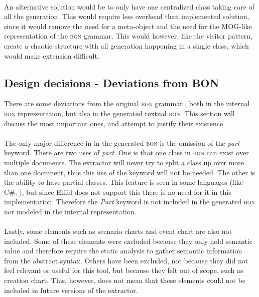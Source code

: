 \paragraph{}
An alternative solution would be to only have one centralized class taking care of all the generation. This would require less overhead than implemented solution, since it would remove the need for a meta-object and the need for the MOG-like representation of the \textsc{bon} grammar. This would however, like the visitor pattern, create a chaotic structure with all generation happening in a single class, which would make extension difficult.

\subsection{Design decisions - Deviations from BON}
\label{deviations_from_bon}There are some deviations from the original \textsc{bon} grammar \cite[pp.~352-359]{walden1995}, both in the internal \textsc{bon} representation, but also in the generated textual \textsc{bon}. This section will discuss the most important ones, and attempt to justify their existence. 

\paragraph{}
The only major difference in in the generated \textsc{bon} is the omission of the \textit{part} keyword. There are two uses of \textit{part}. One is that one class in \textsc{bon} can exist over multiple documents. The extractor will never try to split a class up over more than one document, thus this use of the keyword will not be needed. The other is the ability to have partial classes. This feature is seen in some languages (like C\#, \cite{msdn2009}), but since Eiffel does not support this there is no need for it in this implementation. Therefore the \textit{Part} keyword is not included in the generated \textsc{bon} nor modeled in the internal representation.

\paragraph{}
Lastly, some elements such as scenario charts and event chart are also not included. Some of these elements were excluded because they only hold semantic value and therefore require the static analysis to gather semantic information from the abstract syntax. Others have been excluded, not because they did not feel relevant or useful for this tool, but because they felt out of scope, such as creation chart. This, however, does not mean that these elements could not be included in future versions of the extractor.
